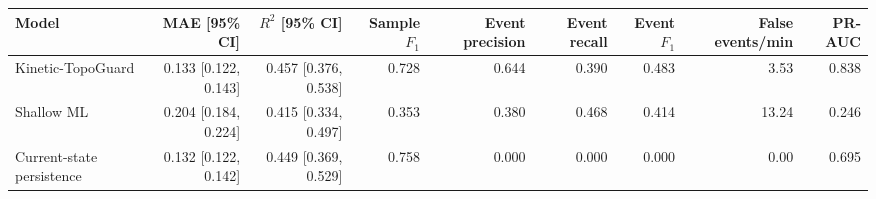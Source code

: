 \begin{tabular}{lrrrrrrrr}
\toprule
Model & MAE [95\% CI] & $R^2$ [95\% CI] & Sample $F_1$ & Event precision & Event recall & Event $F_1$ & False events/min & PR-AUC \\
\midrule
Kinetic-TopoGuard & 0.133 [0.122, 0.143] & 0.457 [0.376, 0.538] & 0.728 & 0.644 & 0.390 & 0.483 & 3.53 & 0.838 \\
Shallow ML & 0.204 [0.184, 0.224] & 0.415 [0.334, 0.497] & 0.353 & 0.380 & 0.468 & 0.414 & 13.24 & 0.246 \\
Current-state persistence & 0.132 [0.122, 0.142] & 0.449 [0.369, 0.529] & 0.758 & 0.000 & 0.000 & 0.000 & 0.00 & 0.695 \\
\bottomrule
\end{tabular}
